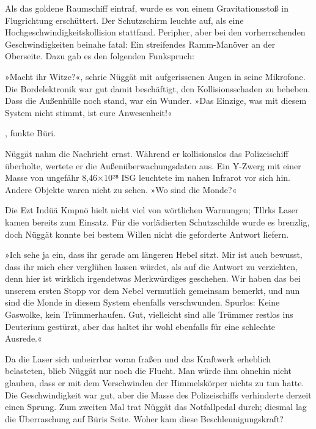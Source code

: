 Als das goldene Raumschiff eintraf, wurde es von einem Gravitationsstoß in Flugrichtung erschüttert. Der Schutzschirm leuchte auf, als eine Hochgeschwindigkeitskollision stattfand. Peripher, aber bei den vorherrschenden Geschwindigkeiten beinahe fatal: Ein streifendes Ramm-Manöver an der Oberseite. Dazu gab es den folgenden Funkspruch: 

»Macht ihr Witze?«, schrie Nüggät mit aufgerissenen Augen in seine Mikrofone. Die Bordelektronik war gut damit beschäftigt, den Kollisionsschaden zu beheben. Dass die Außenhülle noch stand, war ein Wunder. »Das Einzige, was mit diesem System nicht stimmt, ist eure Anwesenheit!«

, funkte Büri. 

Nüggät nahm die Nachricht ernst. Während er kollisionslos das Polizeischiff überholte, wertete er die Außenüberwachungsdaten aus. Ein Y-Zwerg mit einer Masse von ungefähr 8,46×10²⁸ ISG leuchtete im nahen Infrarot vor sich hin. Andere Objekte waren nicht zu sehen. »Wo sind die Monde?«

 Die Ezt Indüä Kmpnö hielt nicht viel von wörtlichen Warnungen; Tllrks Laser kamen bereits zum Einsatz. Für die vorlädierten Schutzschilde wurde es brenzlig, doch Nüggät konnte bei bestem Willen nicht die geforderte Antwort liefern.

»Ich sehe ja ein, dass ihr gerade am längeren Hebel sitzt. Mir ist auch bewusst, dass ihr mich eher verglühen lassen würdet, als auf die Antwort zu verzichten, denn hier ist wirklich irgendetwas Merkwürdiges geschehen. Wir haben das bei unserem ersten Stopp vor dem Nebel vermutlich gemeinsam bemerkt, und nun sind die Monde in diesem System ebenfalls verschwunden. Spurlos: Keine Gaswolke, kein Trümmerhaufen. Gut, vielleicht sind alle Trümmer restlos ins Deuterium gestürzt, aber das haltet ihr wohl ebenfalls für eine schlechte Ausrede.«

Da die Laser sich unbeirrbar voran fraßen und das Kraftwerk erheblich belasteten, blieb Nüggät nur noch die Flucht. Man würde ihm ohnehin nicht glauben, dass er mit dem Verschwinden der Himmelskörper nichts zu tun hatte. Die Geschwindigkeit war gut, aber die Masse des Polizeischiffs verhinderte derzeit einen Sprung. Zum zweiten Mal trat Nüggät das Notfallpedal durch; diesmal lag die Überraschung auf Büris Seite. Woher kam diese Beschleunigungskraft?

